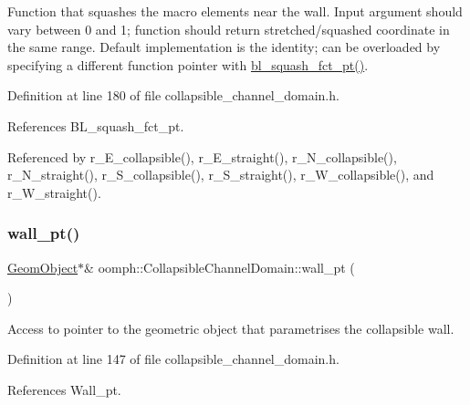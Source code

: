 Function that squashes the macro elements near the wall. Input argument should vary between 0 and 1; function should return stretched/squashed coordinate in the same range. Default implementation is the identity; can be overloaded by specifying a different function pointer with \hyperlink{classoomph_1_1CollapsibleChannelDomain_a9c7def97a2248a8e5a2dca79ee3a54eb}{bl\+\_\+squash\+\_\+fct\+\_\+pt()}. 



Definition at line 180 of file collapsible\+\_\+channel\+\_\+domain.\+h.



References B\+L\+\_\+squash\+\_\+fct\+\_\+pt.



Referenced by r\+\_\+\+E\+\_\+collapsible(), r\+\_\+\+E\+\_\+straight(), r\+\_\+\+N\+\_\+collapsible(), r\+\_\+\+N\+\_\+straight(), r\+\_\+\+S\+\_\+collapsible(), r\+\_\+\+S\+\_\+straight(), r\+\_\+\+W\+\_\+collapsible(), and r\+\_\+\+W\+\_\+straight().

\mbox{\label{classoomph_1_1CollapsibleChannelDomain_a0a98c02b478d61d2cd4c899d0d37344a}} 
\subsubsection{\texorpdfstring{wall\+\_\+pt()}{wall\_pt()}\hspace{0.1cm}{\footnotesize\ttfamily [1/2]}}
{\footnotesize\ttfamily \hyperlink{classoomph_1_1GeomObject}{Geom\+Object}$\ast$\& oomph\+::\+Collapsible\+Channel\+Domain\+::wall\+\_\+pt (\begin{DoxyParamCaption}{ }\end{DoxyParamCaption})\hspace{0.3cm}{\ttfamily [inline]}}



Access to pointer to the geometric object that parametrises the collapsible wall. 



Definition at line 147 of file collapsible\+\_\+channel\+\_\+domain.\+h.



References Wall\+\_\+pt.



